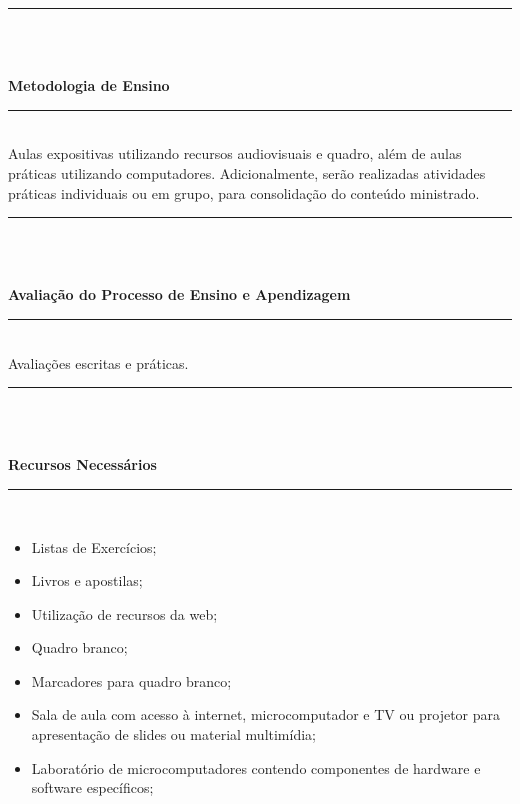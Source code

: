 \noindent\rule{16.5cm}{0.4pt}\\
\\
\vspace{-12mm}
\begin{center}\textbf{Metodologia de Ensino}\end{center} 
\vspace{-5mm}
\noindent\rule{16.5cm}{0.4pt}
\\
   Aulas expositivas utilizando recursos audiovisuais e quadro, além de aulas práticas utilizando computadores. Adicionalmente, serão realizadas atividades práticas individuais ou em grupo, para consolidação do conteúdo ministrado.\\
\noindent\rule{16.5cm}{0.4pt}\\
\\
\vspace{-12mm}
\begin{center}\textbf{Avaliação do Processo de Ensino e Apendizagem}\end{center}
\vspace{-5mm}
\noindent\rule{16.5cm}{0.4pt}
\\
   Avaliações escritas e pr\'aticas.\\
\noindent\rule{16.5cm}{0.4pt}\\
\\
\vspace{-12mm}
\begin{center}\textbf{Recursos Necessários}\end{center}
\vspace{-5mm}
\noindent\rule{16.5cm}{0.4pt}
\\
\begin{itemize} 
  \item Listas de Exercícios;
  \item Livros e apostilas;
  \item Utilização de recursos da web;
  \item Quadro branco;
  \item Marcadores para quadro branco;
  \item Sala de aula com acesso à internet, microcomputador e TV ou projetor para apresentação de slides ou material multimídia;
  \item Laboratório de microcomputadores contendo componentes de hardware e software específicos;
\end{itemize}
